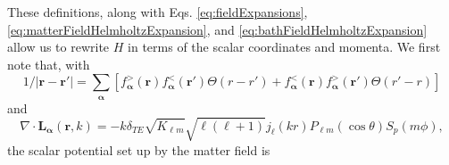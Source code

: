 \documentclass{article}
\begin{document}
These definitions, along with Eqs. \eqref{eq:fieldExpansions}, \eqref{eq:matterFieldHelmholtzExpansion}, and \eqref{eq:bathFieldHelmholtzExpansion} allow us to rewrite $H$ in terms of the scalar coordinates and momenta. We first note that, with 
\begin{equation}
1/|\mathbf{r} - \mathbf{r}'| = \sum_{\bm{\alpha}}[f_{\bm{\alpha}}^>(\mathbf{r})f_{\bm{\alpha}}^<(\mathbf{r}')\Theta(r - r') + f_{\bm{\alpha}}^<(\mathbf{r})f_{\bm{\alpha}}^>(\mathbf{r}')\Theta(r' - r)]
\end{equation}
and
\begin{equation}
\nabla\cdot\mathbf{L}_{\bm{\alpha}}(\mathbf{r},k) = -k\delta_{TE}\sqrt{K_{\ell m}}\sqrt{\ell(\ell + 1)}j_\ell(kr)P_{\ell m}(\cos\theta)S_p(m\phi),
\end{equation}
the scalar potential set up by the matter field is
\end{document}
